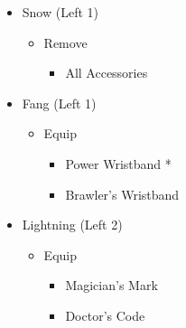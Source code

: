 \documentclass{report}
\begin{document}
\begin{menu}
\begin{itemize}
\begin{itemize}
\begin{itemize}
        \end{itemize}
        \item Snow (Left 1)
        \begin{itemize}
            \item Remove
            \begin{itemize}
                \item All Accessories
            \end{itemize}
        \end{itemize}
        \item Fang (Left 1)
        \begin{itemize}
            \item Equip
            \begin{itemize}
                \item Power Wristband *
                \item Brawler's Wristband
            \end{itemize}
        \end{itemize}
        \item Lightning (Left 2)
        \begin{itemize}
            \item Equip
            \begin{itemize}
                \item Magician's Mark
                \item Doctor's Code
            \end{itemize}
        \end{itemize}
    \end{itemize}
\end{itemize}
\end{menu}
\renewcommand{\fourth}{[4] Relentless Assault (\rav/\rav/\com)}
\renewcommand{\fifth}{[5] Aggression (\com/\rav/\com)}
\end{document}
